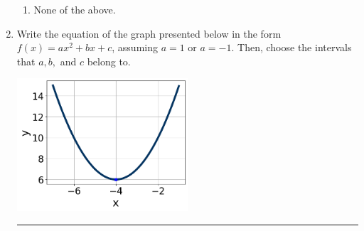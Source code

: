 \documentclass[14pt]{extbook}
\newcommand{\litem}[1]{\item#1\hspace*{-1cm}\rule{\textwidth}{0.4pt}}
\begin{document}
\begin{enumerate}
{\begin{enumerate}[label=\Alph*.]
\item None of the above.
\end{enumerate} }
\litem{
Write the equation of the graph presented below in the form $f(x)=ax^2+bx+c$, assuming  $a=1$ or $a=-1$. Then, choose the intervals that $a, b,$ and $c$ belong to.
\begin{center}
    \includegraphics[width=0.5\textwidth]{../Figures/quadraticGraphToEquationC.png}

\end{center}}
\end{enumerate}
\end{document}

